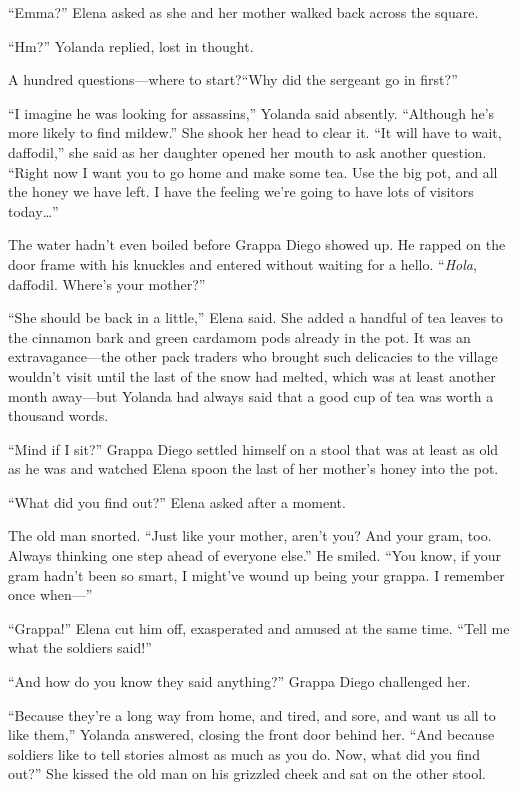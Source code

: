 \documentclass[10pt]{book}
\begin{document}
``Emma?'' Elena asked as she and her mother walked back across the square.

``Hm?'' Yolanda replied, lost in thought.

A hundred questions---where to start?``Why did the sergeant go in first?''

``I imagine he was looking for assassins,'' Yolanda said absently. ``Although he's more likely to find mildew.'' She shook her head to clear it. ``It will have to wait, daffodil,'' she said as her daughter opened her mouth to ask another question. ``Right now I want you to go home and make some tea. Use the big pot, and all the honey we have left. I have the feeling we're going to have lots of visitors today{\ldots}''

The water hadn't even boiled before Grappa Diego showed up. He rapped on the door frame with his knuckles and entered without waiting for a hello. ``\emph{Hola}, daffodil. Where's your mother?''

``She should be back in a little,'' Elena said. She added a handful of tea leaves to the cinnamon bark and green cardamom pods already in the pot. It was an extravagance---the other pack traders who brought such delicacies to the village wouldn't visit until the last of the snow had melted, which was at least another month away---but Yolanda had always said that a good cup of tea was worth a thousand words.

``Mind if I sit?'' Grappa Diego settled himself on a stool that was at least as old as he was and watched Elena spoon the last of her mother's honey into the pot.

``What did you find out?'' Elena asked after a moment.

The old man snorted. ``Just like your mother, aren't you? And your gram, too. Always thinking one step ahead of everyone else.'' He smiled. ``You know, if your gram hadn't been so smart, I might've wound up being your grappa. I remember once when---''

``Grappa!'' Elena cut him off, exasperated and amused at the same time. ``Tell me what the soldiers said!''

``And how do you know they said anything?'' Grappa Diego challenged her.

``Because they're a long way from home, and tired, and sore, and want us all to like them,'' Yolanda answered, closing the front door behind her. ``And because soldiers like to tell stories almost as much as you do. Now, what did you find out?'' She kissed the old man on his grizzled cheek and sat on the other stool.
\end{document}
